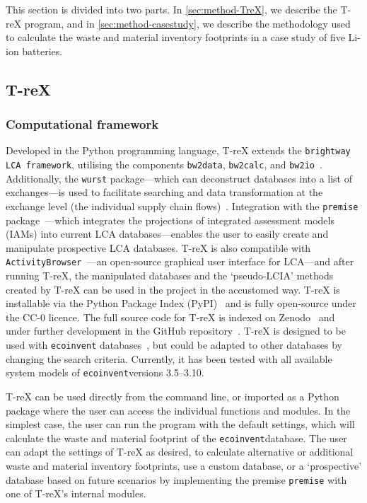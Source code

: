 This section is divided into two parts. In \autoref{sec:method-TreX}, we describe the T-reX program, and in \autoref{sec:method-casestudy}, we describe the methodology used to calculate the waste and material inventory footprints in a case study of five Li-ion batteries.

\subsection{T-reX}\label{sec:method-TreX}

\subsubsection{Computational framework}

Developed in the Python programming language, T-reX extends the \texttt{brightway LCA framework}, utilising the components \texttt{bw2data}, \texttt{bw2calc}, and \texttt{bw2io}~\citep{mutel2017brightway}. Additionally, the \texttt{wurst} package---which can deconstruct databases into a list of exchanges---is used to facilitate searching and data transformation at the exchange level (the individual supply chain flows)~\citep{mutel2017wurst}. Integration with the \texttt{premise} package~\citep{sacchi2022premise}---which integrates the projections of integrated assessment models (IAMs) into current LCA databases---enables the user to easily create and manipulate prospective LCA databases. T-reX is also compatible with \texttt{ActivityBrowser}~\citep{steubing2020activitybrowser}---an open-source graphical user interface for LCA---and after running T-reX, the manipulated databases and the `pseudo-LCIA' methods created by T-reX can be used in the project in the accustomed way. T-reX is installable via the Python Package Index (PyPI)~\citep{mcdowall2023T-reXpipy} and is fully open-source under the CC-0 licence. The full source code for T-reX is indexed on Zenodo~\citep{mcdowall2023T-reXzenodo} and under further development in the GitHub repository~\citep{mcdowall2024T-reXgithub}. T-reX is designed to be used with \texttt{ecoinvent} databases~\citep{ecoinvent2016version3}, but could be adapted to other databases by changing the search criteria. Currently, it has been tested with all available system models of \texttt{ecoinvent}versions 3.5--3.10.

T-reX can be used directly from the command line, or imported as a Python package where the user can access the individual functions and modules. In the simplest case, the user can run the program with the default settings, which will calculate the waste and material footprint of the \texttt{ecoinvent}database. The user can adapt the settings of T-reX as desired, to calculate alternative or additional waste and material inventory footprints, use a custom database, or a `prospective' database based on future scenarios by implementing the premise \texttt{premise} with one of T-reX's internal modules.

